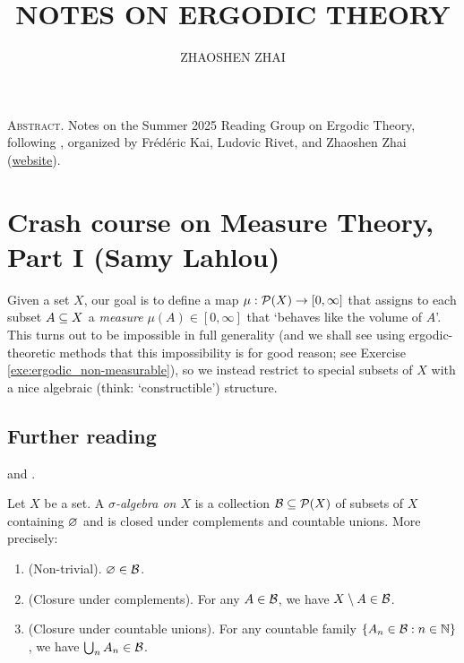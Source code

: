 \documentclass[reqno, twoside]{article}
\begin{document}
    \title{\textbf{\normalsize\MakeUppercase{Notes on Ergodic Theory}}}
    \author{\footnotesize\MakeUppercase{Zhaoshen Zhai}}
    \date{}
    \maketitle

    \begin{center}
        \vspace{-0.3in}
        \begin{minipage}{0.85\textwidth}
            {\footnotesize{\textsc{Abstract.}} Notes on the Summer 2025 Reading Group on Ergodic Theory, following \cite{Tse22}, organized by Frédéric Kai, Ludovic Rivet, and Zhaoshen Zhai (\href{https://ergodicmcgill.github.io/}{website}).}
        \end{minipage}
    \end{center}

    \tableofcontents\vspace{0.2in}

    \section{Crash course on Measure Theory, Part I (Samy Lahlou)}\label{sec:1}

    Given a set $X$, our goal is to define a map $\mu:\mathcal{P}(X)\to[0,\infty]$ that assigns to each subset $A\subseteq X$ a \textit{measure} $\mu(A)\in[0,\infty]$ that `behaves like the volume of $A$'. This turns out to be impossible in full generality (and we shall see using ergodic-theoretic methods that this impossibility is for good reason; see Exercise \ref{exe:ergodic_non-measurable}), so we instead restrict to special subsets of $X$ with a nice algebraic (think: `constructible') structure.

    {\vspace{-0.1in}\small\subsection*{Further reading}\cite[Lectures 1 to 5]{Tse23} and \cite[Chapter 1]{Fol99}.}

    \begin{definition}\label{def:sigma_algebra}
        Let $X$ be a set. A \textit{$\sigma$-algebra on $X$} is a collection $\mathcal{B}\subseteq\mathcal{P}(X)$ of subsets of $X$ containing $\varnothing$ and is closed under complements and countable unions. More precisely:
        \begin{enumerate}
            \item (Non-trivial). $\varnothing\in\mathcal{B}$.
                \vspace{-0.05in}
            \item (Closure under complements). For any $A\in\mathcal{B}$, we have $X\setminus A\in\mathcal{B}$.
                \vspace{-0.05in}
            \item (Closure under countable unions). For any countable family $\left\{A_n\in\mathcal{B}: n\in\mathbb{N}\right\}$, we have $\bigcup_nA_n\in\mathcal{B}$.
        \end{enumerate}
    \end{definition}
\end{document}
